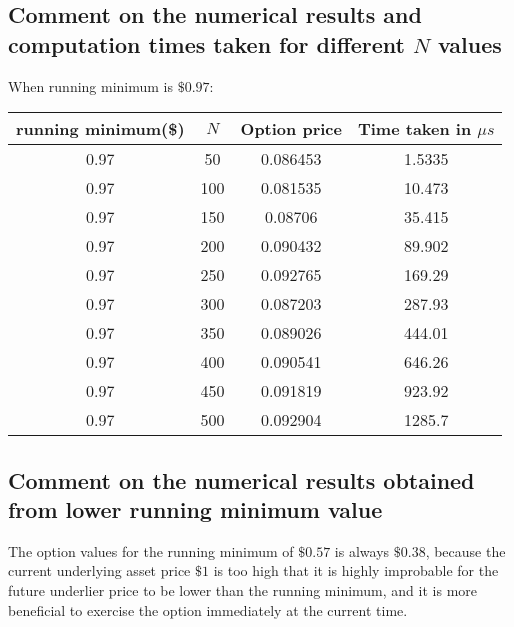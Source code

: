 \subsection{Comment on the numerical results and computation times taken for different $N$ values}

\hspace{23mm} When running minimum is $\$0.97$: \\
\begin{center}
	\begin{tabular}{| c | c | c | c |}
		\hline running minimum(\$) & $N$ & Option price & Time taken in $\mu s$\\
		[0.5ex]
		\hline 0.97 & 50 & 0.086453 & 1.5335 \\
		\hline 0.97 & 100 & 0.081535 & 10.473 \\
		\hline 0.97 & 150 & 0.08706 & 35.415 \\
		\hline 0.97 & 200 & 0.090432 & 89.902 \\
		\hline 0.97 & 250 & 0.092765 & 169.29 \\
		\hline 0.97 & 300 & 0.087203 & 287.93 \\
		\hline 0.97 & 350 & 0.089026 & 444.01 \\
		\hline 0.97 & 400 & 0.090541 & 646.26 \\
		\hline 0.97 & 450 & 0.091819 & 923.92 \\
		\hline 0.97 & 500 & 0.092904 & 1285.7 \\
		\hline
	\end{tabular}
\end{center}

\subsection{Comment on the numerical results obtained from lower running minimum value}
The option values for the running minimum of $\$0.57$ is always $\$0.38$, because the current underlying asset price $\$1$ is too high that it is highly improbable for the future underlier price to be lower than the running minimum, and it is more beneficial to exercise the option immediately at the current time.


